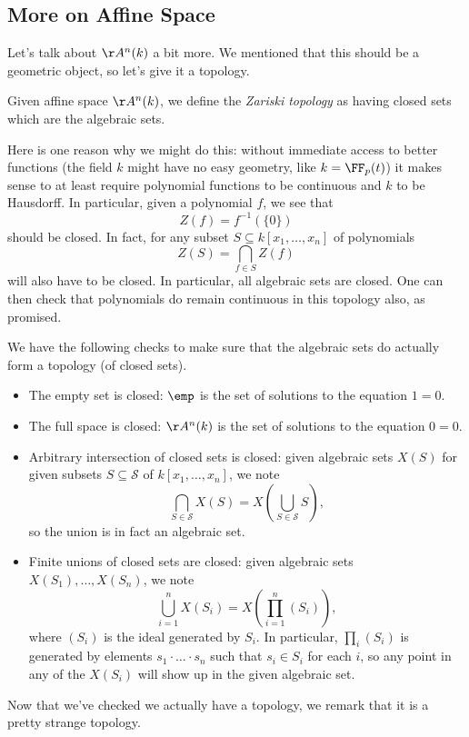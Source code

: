 \subsection{More on Affine Space}
Let's talk about $\AA^n(k)$ a bit more. We mentioned that this should be a geometric object, so let's give it a topology.
\begin{definition}
	Given affine space $\AA^n(k)$, we define the \textit{Zariski topology} as having closed sets which are the algebraic sets.
\end{definition}
\begin{remark}[Nir]
	Here is one reason why we might do this: without immediate access to better functions (the field $k$ might have no easy geometry, like $k=\FF_p(t)$) it makes sense to at least require polynomial functions to be continuous and $k$ to be Hausdorff. In particular, given a polynomial $f$, we see that
	\[Z(f)=f^{-1}(\{0\})\]
	should be closed. In fact, for any subset $S\subseteq k[x_1,\ldots,x_n]$ of polynomials
	\[Z(S)=\bigcap_{f\in S}Z(f)\]
	will also have to be closed. In particular, all algebraic sets are closed. One can then check that polynomials do remain continuous in this topology also, as promised.
\end{remark}
We have the following checks to make sure that the algebraic sets do actually form a topology (of closed sets).
\begin{itemize}
	\item The empty set is closed: $\emp$ is the set of solutions to the equation $1=0$.
	\item The full space is closed: $\AA^n(k)$ is the set of solutions to the equation $0=0$.
	\item Arbitrary intersection of closed sets is closed: given algebraic sets $X(S)$ for given subsets $S\subseteq\mathcal S$ of $k[x_1,\ldots,x_n]$, we note
	\[\bigcap_{S\in\mathcal S}X(S)=X\left(\bigcup_{S\in\mathcal S}S\right),\]
	so the union is in fact an algebraic set.
	\item Finite unions of closed sets are closed: given algebraic sets $X(S_1),\ldots,X(S_n)$, we note
	\[\bigcup_{i=1}^nX(S_i)=X\left(\prod_{i=1}^n(S_i)\right),\]
	where $(S_i)$ is the ideal generated by $S_i$. In particular, $\prod_i(S_i)$ is generated by elements $s_1\cdot\ldots\cdot s_n$ such that $s_i\in S_i$ for each $i$, so any point in any of the $X(S_i)$ will show up in the given algebraic set.
\end{itemize}
Now that we've checked we actually have a topology, we remark that it is a pretty strange topology.
